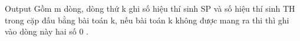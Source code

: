 Output
Gồm m dòng, dòng thứ k ghi số hiệu thí sinh SP và số hiệu thí sinh TH trong cặp đấu bằng bài toán k, nếu bài toán k không được mang ra thi thì ghi vào dòng này hai số 0 .